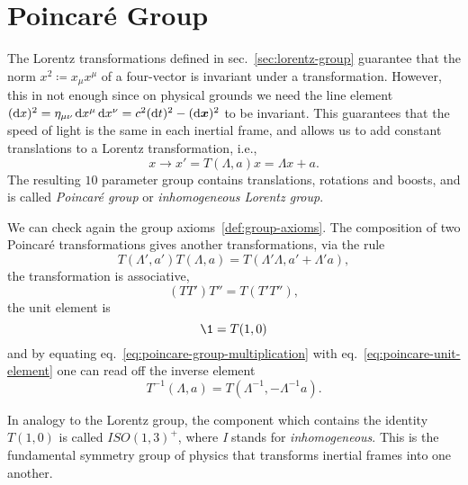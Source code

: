\section{Poincaré Group}
The Lorentz transformations defined in sec.~\ref{sec:lorentz-group} guarantee that the norm $x^2 \coloneq x_\mu x^\mu$ of a four-vector is invariant under a transformation. However, this in not enough since on physical grounds we need the line element $(\mathop{}\!\mathrm{d} x)^2 = \eta_{\mu\nu} \mathop{}\!\mathrm{d} x^\mu \mathop{}\!\mathrm{d} x^\nu = c^2 (\mathop{}\!\mathrm{d} t)^2 - (\mathop{}\!\mathrm{d} \boldsymbol{x})^2$ to be invariant. This guarantees that the speed of light is the same in each inertial frame, and allows us to add constant translations to a Lorentz transformation, i.e.,
\begin{equation}
    x \to x' = T(\Lambda, a) x = \Lambda x + a .
\end{equation}
The resulting $10$ parameter group contains translations, rotations and boosts, and is called \emph{Poincaré group} or \emph{inhomogeneous Lorentz group}.

We can check again the group axioms~\ref{def:group-axioms}. The composition of two Poincaré transformations gives another transformations, via the rule
\begin{equation}\label{eq:poincare-group-multiplication}
    T(\Lambda', a') T(\Lambda, a) = T(\Lambda' \Lambda, a' + \Lambda' a),
\end{equation}
the transformation is associative,
\begin{equation}
    (TT')T'' = T(T'T''),
\end{equation}
the unit element is
\begin{equation}\label{eq:poincare-unit-element}
    \1 = T(1,0)
\end{equation}
and by equating eq.~\eqref{eq:poincare-group-multiplication} with eq.~\eqref{eq:poincare-unit-element} one can read off the inverse element
\begin{equation}\label{eq:poincare-inverse-element}
    T^{-1}(\Lambda, a) = T(\Lambda^{-1}, -\Lambda^{-1}a).
\end{equation}

In analogy to the Lorentz group, the component which contains the identity $T(1,0)$ is called $ISO(1,3)^+$, where \emph{I} stands for \emph{inhomogeneous}. This is the fundamental symmetry group of physics that transforms inertial frames into one another.



